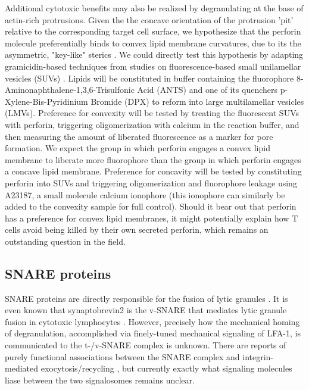 Additional cytotoxic benefits may also be realized by degranulating at the base of actin-rich protrusions. Given the the concave orientation of the protrusion 'pit' relative to the corresponding target cell surface, we hypothesize that the perforin molecule preferentially binds to convex lipid membrane curvatures, due to its the  asymmetric, "key-like" sterics \cite{Law2010}. We could directly test this hypothesis by adapting gramicidin-based techniques from studies on fluorescence-based small unilamellar vesicles (SUVs) \cite{Ingolfsson2010,  Polozov2001}. Lipids will be constituted in buffer containing the fluorophore 8-Aminonaphthalene-1,3,6-Trisulfonic Acid (ANTS) and one of its quenchers p-Xylene-Bis-Pyridinium Bromide (DPX) to reform into large multilamellar vesicles (LMVs). Preference for convexity will be tested by treating the fluorescent SUVs with perforin, triggering oligomerization with calcium in the reaction buffer, and then measuring the amount of liberated fluorescence as a marker for pore formation. We expect the group in which perforin engages a convex lipid membrane to liberate more fluorophore than the group in which perforin engages a concave lipid membrane. Preference for concavity will be tested by constituting perforin into SUVs and triggering oligomerization and fluorophore leakage using A23187, a small molecule calcium ionophore (this ionophore can similarly be added to the convexity sample for full control).  Should it bear out that perforin has a preference for convex lipid membranes, it might potentially explain how T cells avoid being killed by their own secreted perforin, which remains an outstanding question in the field.

\subsection{SNARE proteins}
SNARE proteins are directly responsible for the fusion of lytic granules \cite{Chang2017}. It is even known that synaptobrevin2 is the v-SNARE that mediates lytic granule fusion in cytotoxic lymphocytes \cite{Chitirala2019, Matti2013}. However, precisely how the mechanical homing of degranulation, accomplished via finely-tuned mechanical signaling of LFA-1, is communicated to the t-/v-SNARE complex is unknown.  There are reports of purely functional associations between the SNARE complex and integrin-mediated exocytosis/recycling \cite{Riggs2012, Zhuang2020}, but currently exactly what signaling molecules liase between the two signalosomes remains unclear. 

